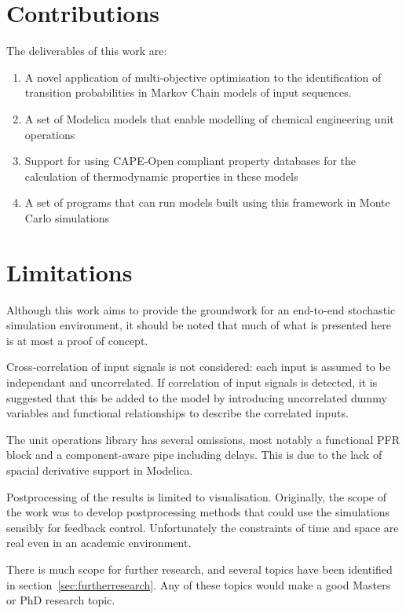 \section{Contributions}
The deliverables of this work are:
\begin{enumerate}
\item A novel application of multi-objective optimisation to the identification of transition probabilities in Markov Chain models of input sequences.
\item A set of Modelica models that enable modelling of chemical engineering unit operations
\item Support for using CAPE-Open compliant property databases for the calculation of thermodynamic properties in these models
\item A set of programs that can run models built using this framework in Monte Carlo simulations
\end{enumerate}

\section{Limitations}
Although this work aims to provide the groundwork for an end-to-end stochastic simulation environment, it should be noted that much of what is presented here is at most a proof of concept.

Cross-correlation of input signals is not considered: each input is assumed to be independant and uncorrelated.
If correlation of input signals is detected, it is suggested that this be added to the model by introducing uncorrelated dummy variables and functional relationships to describe the correlated inputs.

The unit operations library has several omissions, most notably a functional PFR block and a component-aware pipe including delays.  
This is due to the lack of spacial derivative support in Modelica.

Postprocessing of the results is limited to visualisation.
Originally, the scope of the work was to develop postprocessing methods that could use the simulations sensibly for feedback control.
Unfortunately the constraints of time and space are real even in an academic environment.

There is much scope for further research, and several topics have been identified in section~\ref{sec:furtherresearch}.
Any of these topics would make a good Masters or PhD research topic.

